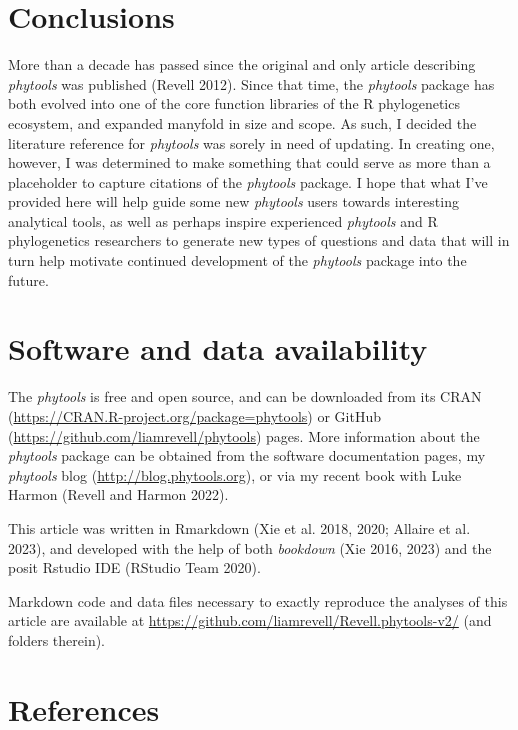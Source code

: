 \documentclass[fleqn,10pt,lineno]{wlpeerj} %
\begin{document}
\hypertarget{conclusions}{%
\section{Conclusions}\label{conclusions}}

More than a decade has passed since the original and only article describing \emph{phytools} was published (Revell 2012). Since that time, the \emph{phytools} package has both evolved into one of the core function libraries of the R phylogenetics ecosystem, and expanded manyfold in size and scope. As such, I decided the literature reference for \emph{phytools} was sorely in need of updating. In creating one, however, I was determined to make something that could serve as more than a placeholder to capture citations of the \emph{phytools} package. I hope that what I've provided here will help guide some new \emph{phytools} users towards interesting analytical tools, as well as perhaps inspire experienced \emph{phytools} and R phylogenetics researchers to generate new types of questions and data that will in turn help motivate continued development of the \emph{phytools} package into the future.

\hypertarget{software-and-data-availability}{%
\section{Software and data availability}\label{software-and-data-availability}}

The \emph{phytools} is free and open source, and can be downloaded from its CRAN (\url{https://CRAN.R-project.org/package=phytools}) or GitHub (\url{https://github.com/liamrevell/phytools}) pages. More information about the \emph{phytools} package can be obtained from the software documentation pages, my \emph{phytools} blog (\url{http://blog.phytools.org}), or via my recent book with Luke Harmon (Revell and Harmon 2022).

This article was written in Rmarkdown (Xie et al. 2018, 2020; Allaire et al. 2023), and developed with the help of both \emph{bookdown} (Xie 2016, 2023) and the posit Rstudio IDE (RStudio Team 2020).

Markdown code and data files necessary to exactly reproduce the analyses of this article are available at \url{https://github.com/liamrevell/Revell.phytools-v2/} (and folders therein).

\hypertarget{references}{%
\section*{References}\label{references}}
\end{document}
